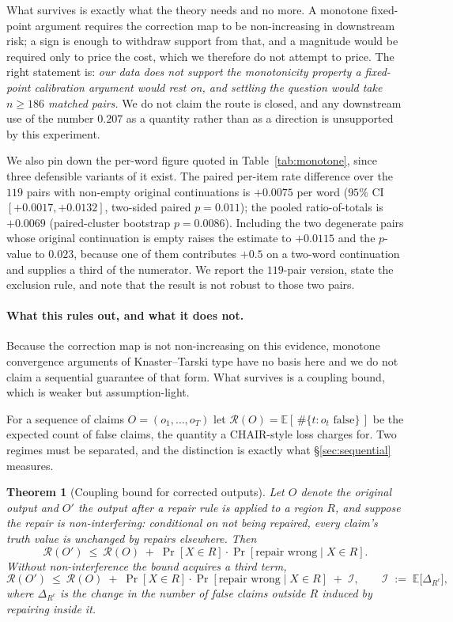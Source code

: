 \documentclass{article}
\theoremstyle{plain}
\newtheorem{theorem}{Theorem}
\theoremstyle{definition}
\theoremstyle{remark}
\newcommand{\Risk}{\mathcal{R}}
\newcommand{\E}{\mathbb{E}}
\newcommand{\Iota}{\mathcal{I}}
\begin{document}
What survives is exactly what the theory needs and no more. A monotone fixed-point argument
requires the correction map to be non-increasing in downstream risk; a sign is enough to withdraw
support from that, and a magnitude would be required only to price the cost, which we therefore do
not attempt to price. The right statement is: \emph{our data does not support the monotonicity
property a fixed-point calibration argument would rest on, and settling the question would take
$n\ge186$ matched pairs.} We do not claim the route is closed, and any downstream use of the
number $0.207$ as a quantity rather than as a direction is unsupported by this experiment.

We also pin down the per-word figure quoted in Table~\ref{tab:monotone}, since three defensible
variants of it exist. The paired per-item rate difference over the $119$ pairs with non-empty original
continuations is $+0.0075$ per word ($95\%$ CI $[+0.0017,+0.0132]$, two-sided paired $p=0.011$);
the pooled ratio-of-totals is $+0.0069$ (paired-cluster bootstrap $p=0.0086$). Including the two
degenerate pairs whose original continuation is empty raises the estimate to $+0.0115$ and the
$p$-value to $0.023$, because one of them contributes $+0.5$ on a two-word continuation and
supplies a third of the numerator. We report the $119$-pair version, state the exclusion rule, and
note that the result is not robust to those two pairs.

\paragraph{What this rules out, and what it does not.}
Because the correction map is not non-increasing on this evidence, monotone convergence arguments
of Knaster--Tarski type have no basis here and we do not claim a sequential guarantee of that
form. What survives is a coupling bound, which is weaker but assumption-light.

For a sequence of claims $O=(o_1,\dots,o_T)$ let $\Risk(O)=\E[\,\#\{t:o_t\text{ false}\}\,]$
be the expected count of false claims, the quantity a CHAIR-style loss charges for. Two
regimes must be separated, and the distinction is exactly what \S\ref{sec:sequential}
measures.

\begin{theorem}[Coupling bound for corrected outputs]
\label{thm:coupling}
Let $O$ denote the original output and $O'$ the output after a repair rule is applied to a
region $R$, and suppose the repair is \emph{non-interfering}: conditional on not being
repaired, every claim's truth value is unchanged by repairs elsewhere. Then
\[
\Risk(O')\ \le\ \Risk(O)\;+\;\Pr[X\in R]\cdot\Pr[\text{repair wrong}\mid X\in R].
\]
Without non-interference the bound acquires a third term,
\begin{equation}
\label{eq:interference}
\Risk(O')\ \le\ \Risk(O)\;+\;\Pr[X\in R]\cdot\Pr[\text{repair wrong}\mid X\in R]\;+\;\Iota,
\qquad \Iota \;:=\; \E\big[\Delta_{R^c}\big],
\end{equation}
where $\Delta_{R^c}$ is the change in the number of false claims outside $R$ induced by
repairing inside it.
\end{theorem}
\end{document}
